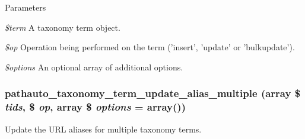 \begin{DoxyParams}{Parameters}
\item[{\em \$term}]A taxonomy term object. \item[{\em \$op}]Operation being performed on the term ('insert', 'update' or 'bulkupdate'). \item[{\em \$options}]An optional array of additional options. \end{DoxyParams}
\hypertarget{pathauto_8module_aeeb7b2b0dc21146863ea234e0fb9b427}{
\subsubsection[{pathauto\_\-taxonomy\_\-term\_\-update\_\-alias\_\-multiple}]{\setlength{\rightskip}{0pt plus 5cm}pathauto\_\-taxonomy\_\-term\_\-update\_\-alias\_\-multiple (array \$ {\em tids}, \/  \$ {\em op}, \/  array \$ {\em options} = {\ttfamily array()})}}
\label{pathauto_8module_aeeb7b2b0dc21146863ea234e0fb9b427}
Update the URL aliases for multiple taxonomy terms.


